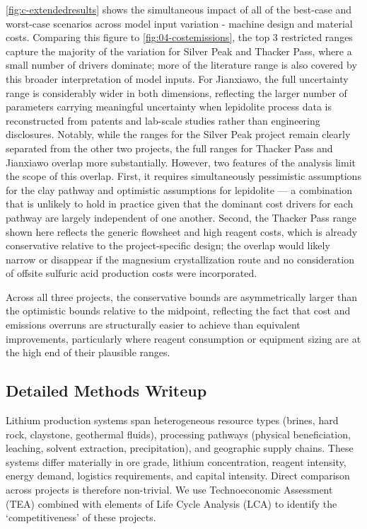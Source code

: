 \ref{fig:c-extendedresults} shows the simultaneous impact of all of the best-case and worst-case scenarios across model input variation - machine design and material costs. Comparing this figure to \ref{fig:04-costemissions}, the top 3 restricted ranges capture the majority of the variation for Silver Peak and Thacker Pass, where a small number of drivers dominate; more of the literature range is also covered by this broader interpretation of model inputs. For Jianxiawo, the full uncertainty range is considerably wider in both dimensions, reflecting the larger number of parameters carrying meaningful uncertainty when lepidolite process data is reconstructed from patents and lab-scale studies rather than engineering disclosures. Notably, while the ranges for the Silver Peak project remain clearly separated from the other two projects, the full ranges for Thacker Pass and Jianxiawo overlap more substantially. However, two features of the analysis limit the scope of this overlap. First, it requires simultaneously pessimistic assumptions for the clay pathway and optimistic assumptions for lepidolite --- a combination that is unlikely to hold in practice given that the dominant cost drivers for each pathway are largely independent of one another. Second, the Thacker Pass range shown here reflects the generic flowsheet and high reagent costs, which is already conservative relative to the project-specific design; the overlap would likely narrow or disappear if the magnesium crystallization route and no consideration of offsite sulfuric acid production costs were incorporated. 

Across all three projects, the conservative bounds are asymmetrically larger than the optimistic bounds relative to the midpoint, reflecting the fact that cost and emissions overruns are structurally easier to achieve than equivalent improvements, particularly where reagent consumption or equipment sizing are at the high end of their plausible ranges.

\clearpage
\subsection{Detailed Methods Writeup}\label{app:04-methods}

Lithium production systems span heterogeneous resource types (brines, hard rock, claystone, geothermal fluids), processing pathways (physical beneficiation, leaching, solvent extraction, precipitation), and geographic supply chains. These systems differ materially in ore grade, lithium concentration, reagent intensity, energy demand, logistics requirements, and capital intensity. Direct comparison across projects is therefore non-trivial. We use Technoeconomic Assessment (TEA) combined with elements of Life Cycle Analysis (LCA) to identify the `competitiveness' of these projects.

